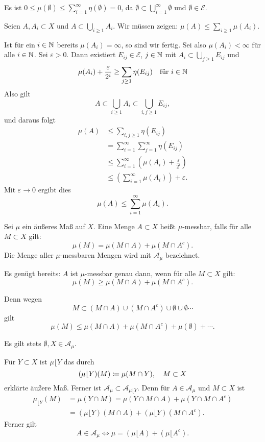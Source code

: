 \documentclass[a4paper,twoside,DIV15,BCOR12mm]{scrbook}
\newcommand{\A}{\mathcal A}
\newcommand{\MR}{\lfloor}
\begin{document}
\begin{beweis}
Es ist $0\le \mu(\emptyset) \le \sum_{i=1}^\infty \eta(\emptyset)=0$, da $\emptyset \subset \bigcup_{i=1}^\infty\emptyset$ und $\emptyset\in\mathcal E$.

Seien $A, A_i\subset X$ und $A\subset \bigcup_{i\ge1}A_i$. Wir müssen zeigen: $\mu(A) \le \sum_{i\ge 1}\mu(A_i)$.

Ist für ein $i\in\mathbb{N}$ bereits $\mu(A_i)=\infty$, so sind wir fertig. Sei also $\mu(A_i)<\infty$ für alle $i\in\mathbb{N}$. Sei $\varepsilon>0$. Dann existiert $E_{ij}\in \mathcal E$, $j\in \mathbb{N}$ mit $A_i\subset \bigcup_{j\ge 1} E_{ij}$ und
\[
\mu(A_i) + \frac{\varepsilon}{2^i}\ge \sum_{j\ge 1}\eta(E_{ij}) \quad \text{für $i\in \mathbb{N}$}
\]
Also gilt
\[
A \subset \bigcup_{i\ge 1} A_i \subset \bigcup_{i,j\ge 1} E_{ij},
\]
und daraus folgt
\begin{align*}
\mu(A) &\le \sum_{i,j\ge 1}\eta(E_{ij}) \\
&= \sum_{i=1}^\infty \sum_{j=1}^\infty \eta(E_{ij}) \\
&\le \sum_{i=1}^\infty (\mu(A_i) + \frac\varepsilon{2^i}) \\
&\le \left( \sum_{i=1}^\infty \mu(A_i) \right) + \varepsilon.
\end{align*}
Mit $\varepsilon \to 0$ ergibt dies
\[
\mu(A) \le \sum_{i=1}^\infty \mu(A_i).
\]
\end{beweis}

\begin{definition}
Sei $\mu$ ein äußeres Maß auf $X$. Eine Menge $A\subset X$ heißt $\mu$-messbar, falls für alle $M\subset X$ gilt:
\[
\mu(M) = \mu(M\cap A) + \mu(M \cap A^c).
\]
Die Menge aller $\mu$-messbaren Mengen wird mit $\A_\mu$ bezeichnet.
\end{definition}

Es genügt bereits: $A$ ist $\mu$-messbar genau dann, wenn für alle $M\subset X$ gilt:
\[
\mu(M) \ge \mu(M\cap A) + \mu(M\cap A^c).
\]

Denn wegen
\[
M\subset (M\cap A) \cup (M\cap A^c) \cup \emptyset \cup \emptyset\cdots
\]
gilt 
\[
\mu(M)\le \mu(M\cap A) + \mu(M\cap A^c) + \mu(\emptyset) + \cdots.
\]

Es gilt stets $\emptyset, X\in\A_\mu$.

\begin{bemerkung}
Für $Y\subset X$ ist $\mu \MR Y$ das durch
\[
(\mu \MR Y)(M) \da \mu(M\cap Y),\quad M\subset X
\]
erklärte äußere Maß. Ferner ist $\A_\mu \subset \A_{\mu \MR Y}$. Denn für $A\in\A_\mu$ und $M\subset X$ ist
\begin{align*}
\mu_{\MR Y}(M)
&= \mu(Y\cap M) = \mu(Y\cap M\cap A) + \mu(Y\cap M \cap A^c) \\
&= (\mu \MR Y) (M\cap A) + (\mu \MR Y)(M\cap A^c).
\end{align*}
Ferner gilt
\[
A \in \A_\mu \iff \mu= (\mu \MR A) + (\mu \MR  A^c).
\]
\end{bemerkung}
\end{document}
